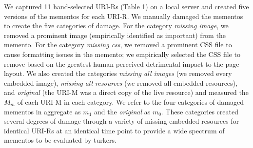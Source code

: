 We captured 11 hand-selected URI-Rs (Table 1) on a local server and created five versions of the mementos for each URI-R. We manually damaged the mementos to create the five categories of damage. For the category \emph{missing image}, we removed a prominent image (empirically identified as important) from the memento. For the category \emph{missing css}, we removed a prominent CSS file to cause formatting issues in the memento; we empirically selected the CSS file to remove based on the greatest human-perceived detrimental impact to the page layout. We also created the categories \emph{missing all images} (we removed every embedded image), \emph{missing all resources} (we removed all embedded resources), and \emph{original} (the URI-M was a direct copy of the live resource) and measured the $M_m$ of each URI-M in each category. We refer to the four categories of damaged mementos in aggregate as $m_1$ and the \emph{original} as $m_0$. These categories created several degrees of damage through a variety of missing embedded resources for identical URI-Rs at an identical time point to provide a wide spectrum of mementos to be evaluated by turkers.


